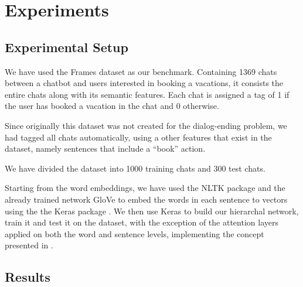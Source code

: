 \section{Experiments}\label{sec:exp}

\subsection{Experimental Setup}
We have used the Frames dataset \cite{frames} as 
our benchmark. Containing 1369 chats between 
a chatbot and users interested in booking a vacations, 
it consists the entire chats along with its semantic features. 
Each chat is assigned a tag of 1 if the user has booked a vacation 
in the chat and 0 otherwise. 

Since originally this dataset was not created for the dialog-ending problem, 
we had tagged all chats automatically, using a other features that exist 
in the dataset, namely sentences that include a ``book'' action. 

We have divided the dataset into 1000 training chats and 300 test chats.

Starting from the word embeddings, we have used the 
NLTK package \cite{DBLP:conf/acl/Bird06} and the already trained network GloVe \cite{glove} 
to embed the words in each sentence to vectors using the the Keras package \cite{chollet2015}. 
We then use Keras to build our hierarchal network, train it and test it on the 
dataset, with the exception of the attention layers applied on both the word and sentence 
levels, implementing the concept presented in \cite{attention,tc}.



\subsection{Results}

